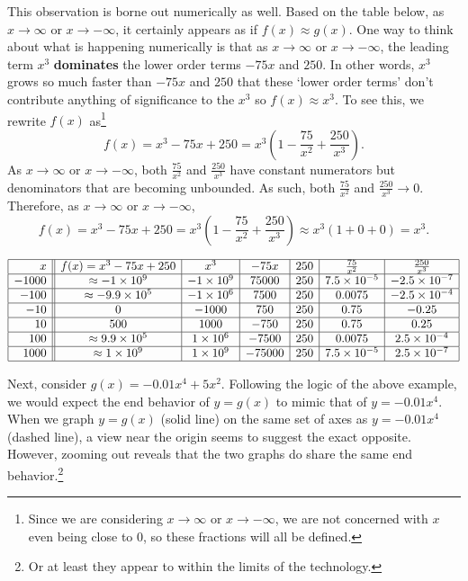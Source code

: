 \documentclass{ximera}
\begin{document}
This observation is borne out numerically as well.  Based on the table below, as $x \rightarrow \infty$ or $x \rightarrow -\infty$, it certainly appears as if $f(x) \approx g(x)$.  One way to think about what is happening numerically is that  as $x \rightarrow \infty$ or $x \rightarrow -\infty$, the leading term $x^3$ \textbf{dominates} the lower order terms  $-75x$ and $250$.  In other words, $x^3$ grows so much faster than $-75 x$ and $250$ that these `lower order terms' don't contribute anything of significance to the $x^3$ so $f(x) \approx x^3$.    To see this, we rewrite $f(x)$ as\footnote{Since we are considering  $x \rightarrow \infty$ or $x \rightarrow -\infty$, we are not concerned with $x$ even being close to $0$, so these fractions will all be defined.}   \[f(x) = x^3  - 75x + 250 = x^3 \left(1 -  \frac{75}{x^2} + \frac{250}{x^3} \right).\]   As $x \rightarrow \infty$ or $x \rightarrow -\infty$, both $\frac{75}{x^2}$ and $\frac{250}{x^3}$ have constant numerators but denominators that are becoming unbounded.  As such, both  $\frac{75}{x^2}$ and $\frac{250}{x^3} \rightarrow 0$.  Therefore, as $x \rightarrow \infty$ or $x \rightarrow -\infty$, \[ f(x) = x^3 - 75x+250  = x^3 \left(1 -  \frac{75}{x^2} + \frac{250}{x^3} \right) \approx x^3 (1 + 0 + 0) = x^3. \]

\[ \begin{array}{|r||c|c|c|c|c|c|}  \hline

 x &  f(x) = x^3 -75x+250 &  x^3 & -75 x & 250 & \frac{75}{x^2} &  \frac{250}{x^3}  \\ \hline
 -1000 & \approx -1 \times 10^9  &   -1 \times 10^9 &75000  & 250 & 7.5 \times 10^{-5} & -2.5 \times 10^{-7} \\  \hline
 -100 & \approx -9.9 \times 10^5 & -1 \times 10^6 & 7500  & 250 & 0.0075 & -2.5 \times 10^{-4} \\  \hline
 -10 & 0  & -1000  & 750 & 250  & 0.75   & -0.25\\  \hline
 10 & 500 &  1000 &  -750 & 250   & 0.75  &  0.25   \\ \hline
 100 &\approx 9.9 \times 10^5  & 1 \times 10^6 &   -7500  & 250 &  0.0075 &   2.5 \times 10^{-4} \\ \hline
 1000 & \approx 1 \times 10^9 & 1 \times 10^9  & -75000 & 250 & 7.5 \times 10^{-5} & 2.5 \times 10^{-7} \\  \hline

\end{array} \]


Next, consider  $g(x) = -0.01x^4 + 5x^2$.  Following the logic of the above example, we would expect the end behavior of $y=g(x)$ to mimic that of $y = -0.01 x^4$.  When we graph $y = g(x)$ (solid line) on the same set of axes as $y = -0.01x^4$ (dashed line), a view near the origin seems to suggest the exact opposite.  However, zooming out reveals that the two graphs do share the same end behavior.\footnote{Or at least they appear to within the limits of the technology.}
\end{document}
